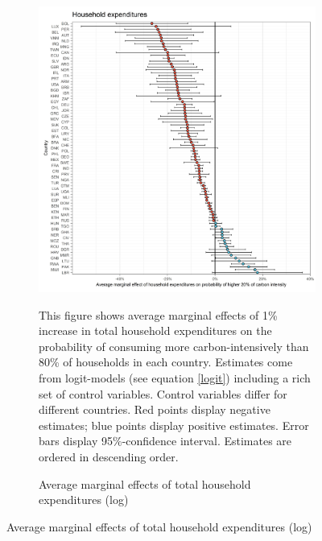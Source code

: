 \begin{figure}[ht!]
  \centering
  \caption{Average marginal effects (logit-models)}\label{fig:Logit_ME}
  \begin{subfigure}[b]{\textwidth}
  \centering
  \caption{Average marginal effects of total household expenditures (log)} \label{fig:Logit_ME_exp}
  \includegraphics{1_Figures/Analysis_Logit_Models_Marginal_Effects/Average_Marginal_Effects_affected_upper_80_log_hh_expenditures_USD_2014_2017.jpg}
  \begin{subcaption2}
     This figure shows average marginal effects of 1\% increase in total household expenditures on the probability of consuming more carbon-intensively than 80\% of households in each country. Estimates come from logit-models (see equation \ref{logit}) including a rich set of control variables. Control variables differ for different countries. Red points display negative estimates; blue points display positive estimates. Error bars display 95\%-confidence interval. Estimates are ordered in descending order.
  \end{subcaption2}
  \end{subfigure}
 \end{figure}
 \clearpage

